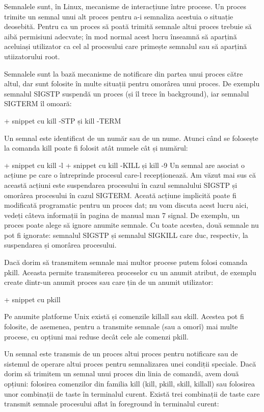 Semnalele sunt, în Linux, mecanisme de interacțiune între procese. Un proces
trimite un semnal unui alt proces pentru a-i semnaliza acestuia o situație
deosebită. Pentru ca un proces să poată trimită semnale altui proces trebuie să
aibă permisiuni adecvate; în mod normal acest lucru înseamnă să aparțină
aceluiași utilizator ca cel al procesului care primește semnalul sau să aparțină
utiizatorului root.

Semnalele sunt la bază mecanisme de notificare din partea unui proces către
altul, dar sunt folosite în multe situații pentru omorârea unui proces. De
exemplu semnalul SIGSTP suspendă un proces (și îl trece în background), iar
semnalul SIGTERM îl omoară:

+  snippet cu kill -STP și kill -TERM

Un semnal este identificat de un număr sau de un nume. Atunci când se folosește
la comanda kill poate fi folosit atât numele cât și numărul:

+  snippet cu kill -l
+  snippet cu kill -KILL și kill -9
%
Un semnal are asociat o acțiune pe care o întreprinde procesul care-l
recepționează. Am văzut mai sus că această acțiuni este suspendarea procesului
în cazul semnalului SIGSTP și omorârea procesului în cazul SIGTERM. Aceată
acțiune implicită poate fi modificată programatic pentru un proces dat; nu vom
discuta acest lucru aici, vedeți câteva informații în pagina de manual man 7
signal. De exemplu, un proces poate alege să ignore anumite semnale. Cu toate
acestea, două semnale nu pot fi ignorate: semnalul SIGSTP și semnalul SIGKILL
care duc, respectiv, la suspendarea și omorârea procesului.

Dacă dorim să transmitem semnale mai multor procese putem folosi comanda pkill.
Aceasta permite transmiterea proceselor cu un anumit atribut, de exemplu create
dintr-un anumit proces sau care țin de un anumit utilizator:

+     snippet cu pkill

Pe anumite platforme Unix există și comenzile killall sau skill. Acestea pot fi
folosite, de asemenea, pentru a transmite semnale (sau a omorî) mai multe
procese, cu opțiuni mai reduse decât cele ale comenzi pkill.

Un semnal este transmis de un proces altui proces pentru notificare sau de
sistemul de operare altui proces pentru semnalizarea unei condiții speciale.
Dacă dorim să trimitem un semnal unui proces din linia de comandă, avem două
opțiuni: folosirea comenzilor din familia kill (kill, pkill, skill, killall) sau
folosirea unor combinații de taste în terminalul curent. Există trei combinații
de taste care transmit semnale procesului aflat în foreground în terminalul
curent:

